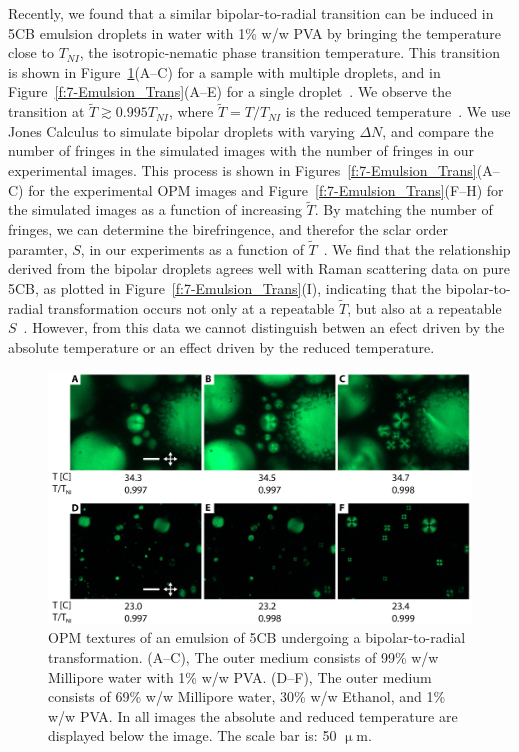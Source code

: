 Recently, we found that a similar bipolar-to-radial transition can be induced in 5CB emulsion droplets in water with 1\% w/w PVA by bringing the temperature close to $T_{NI}$, the isotropic-nematic phase transition temperature.
This transition is shown in Figure~\ref{f:7-Emulsion_Eth}(A--C) for a sample with multiple droplets, and in Figure~\ref{f:7-Emulsion_Trans}(A--E) for a single droplet~\cite{nayani2017role}.
We observe the transition at $\tilde{T} \gtrsim 0.995 T_{NI}$, where $\tilde{T} = T/T_{NI}$ is the reduced temperature~\cite{nayani2017role}.
We use Jones Calculus to simulate bipolar droplets with varying $\Delta N$, and compare the number of fringes in the simulated images with the number of fringes in our experimental images.
This process is shown in Figures~\ref{f:7-Emulsion_Trans}(A--C) for the experimental OPM images and Figure~\ref{f:7-Emulsion_Trans}(F--H) for the simulated images as a function of increasing $\tilde{T}$.
By matching the number of fringes, we can determine the birefringence, and therefor the sclar order paramter, $S$, in our experiments as a function of $\tilde{T}$~\cite{nayani2017role}.
We find that the relationship derived from the bipolar droplets agrees well with Raman scattering data on pure 5CB, as plotted in Figure~\ref{f:7-Emulsion_Trans}(I), indicating that the bipolar-to-radial transformation occurs not only at a repeatable $\tilde{T}$, but also at a repeatable $S$~\cite{nayani2017role}.
However, from this data we cannot distinguish betwen an efect driven by the absolute temperature or an effect driven by the reduced temperature.
\begin{figure}
  \centering
  \includegraphics{figures/C7/Ch7-Figs_Emulsion_Eth.png}
  \caption{OPM textures of an emulsion of 5CB undergoing a bipolar-to-radial transformation.
      (A--C), The outer medium consists of 99\% w/w Millipore water with 1\% w/w PVA.
      (D--F), The outer medium consists of 69\% w/w Millipore water, 30\% w/w Ethanol, and 1\% w/w PVA.
      In all images the absolute and reduced temperature are displayed below the image.
      The scale bar is: 50 $\upmu$m.
      }\label{f:7-Emulsion_Eth}
\end{figure}

